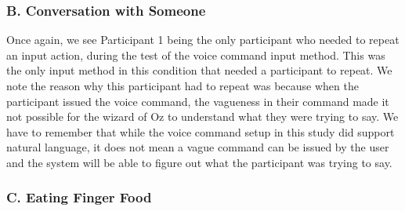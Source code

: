 \documentclass{sigchi}
\begin{document}
\subsubsection{B. Conversation with Someone}

\begin{table}[H] %
\centering
\caption{Number of attempts by each participant for each input method, when in a conversation with someone when a request to intervene was issued}
\label{table:attemptsConversation}
\end{table}

Once again, we see Participant 1 being the only participant who needed to repeat an input action, during the test of the voice command input method. This was the only input method in this condition that needed a participant to repeat. We note the reason why this participant had to repeat was because when the participant issued the voice command, the vagueness in their command made it not possible for the wizard of Oz to understand what they were trying to say. We have to remember that while the voice command setup in this study did support natural language, it does not mean a vague command can be issued by the user and the system will be able to figure out what the participant was trying to say.

\subsubsection{C. Eating Finger Food}
\end{document}
